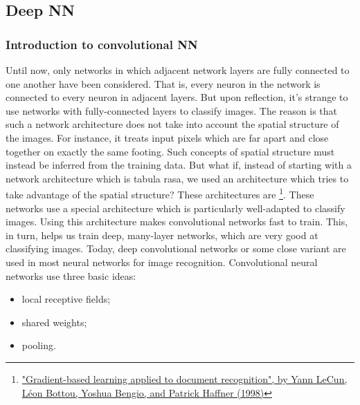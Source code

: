 \subsection{Deep NN}

\subsubsection{Introduction to convolutional NN}
Until now, only networks in which adjacent network layers are fully connected to one another have been considered. That is, every neuron in the network is connected to every neuron in adjacent layers. But upon reflection, it's strange to use networks with fully-connected layers to classify images. The reason is that such a network architecture does not take into account the spatial structure of the images. For instance, it treats input pixels which are far apart and close together on exactly the same footing. Such concepts of spatial structure must instead be inferred from the training data. But what if, instead of starting with a network architecture which is tabula rasa, we used an architecture which tries to take advantage of the spatial structure? These architectures are \footnote{\href{http://yann.lecun.com/exdb/publis/pdf/lecun-98.pdf}{ "Gradient-based learning applied to document recognition", by Yann LeCun, Léon Bottou, Yoshua Bengio, and Patrick Haffner (1998)}}. These networks use a special architecture which is particularly well-adapted to classify images. Using this architecture makes convolutional networks fast to train. This, in turn, helps us train deep, many-layer networks, which are very good at classifying images. Today, deep convolutional networks or some close variant are used in most neural networks for image recognition.
Convolutional neural networks use three basic ideas: 

\begin{itemize}
\item local receptive fields;
\item shared weights;
\item pooling.
\end{itemize}

